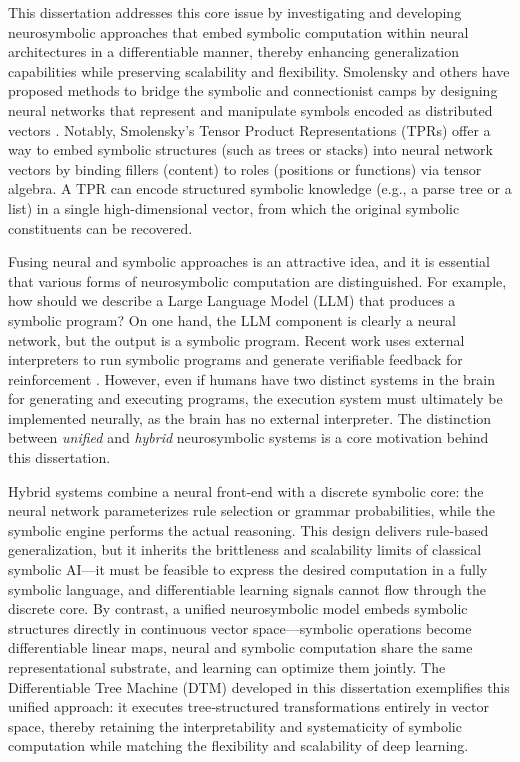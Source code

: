 This dissertation addresses this core issue by investigating and developing neurosymbolic approaches that embed symbolic computation within neural architectures in a differentiable manner, thereby enhancing generalization capabilities while preserving scalability and flexibility. Smolensky and others have proposed methods to bridge the symbolic and connectionist camps by designing neural networks that represent and manipulate symbols encoded as distributed vectors \citep{Smolensky1990TensorPV,gayler2003vsa_jackendoff,plate,pollack_recursive_1990}. Notably, Smolensky’s Tensor Product Representations (TPRs) offer a way to embed symbolic structures (such as trees or stacks) into neural network vectors by binding fillers (content) to roles (positions or functions) via tensor algebra. A TPR can encode structured symbolic knowledge (e.g., a parse tree or a list) in a single high-dimensional vector, from which the original symbolic constituents can be recovered.

Fusing neural and symbolic approaches is an attractive idea, and it is essential that various forms of neurosymbolic computation are distinguished. For example, how should we describe a Large Language Model (LLM) that produces a symbolic program? On one hand, the LLM component is clearly a neural network, but the output is a symbolic program. Recent work uses external interpreters to run symbolic programs and generate verifiable feedback for reinforcement \citep{deepseekai2025deepseekr1incentivizingreasoningcapability}. However, even if humans have two distinct systems in the brain for generating and executing programs, the execution system must ultimately be implemented neurally, as the brain has no external interpreter. The distinction between \textit{unified} and \textit{hybrid} neurosymbolic systems is a core motivation behind this dissertation.

Hybrid systems combine a neural front‑end with a discrete symbolic core: the neural network parameterizes rule selection or grammar probabilities, while the symbolic engine performs the actual reasoning. This design delivers rule‑based generalization, but it inherits the brittleness and scalability limits of classical symbolic AI—it must be feasible to express the desired computation in a fully symbolic language, and differentiable learning signals cannot flow through the discrete core. By contrast, a unified neurosymbolic model embeds symbolic structures directly in continuous vector space—symbolic operations become differentiable linear maps, neural and symbolic computation share the same representational substrate, and learning can optimize them jointly. The Differentiable Tree Machine (DTM) developed in this dissertation exemplifies this unified approach: it executes tree‐structured transformations entirely in vector space, thereby retaining the interpretability and systematicity of symbolic computation while matching the flexibility and scalability of deep learning.

